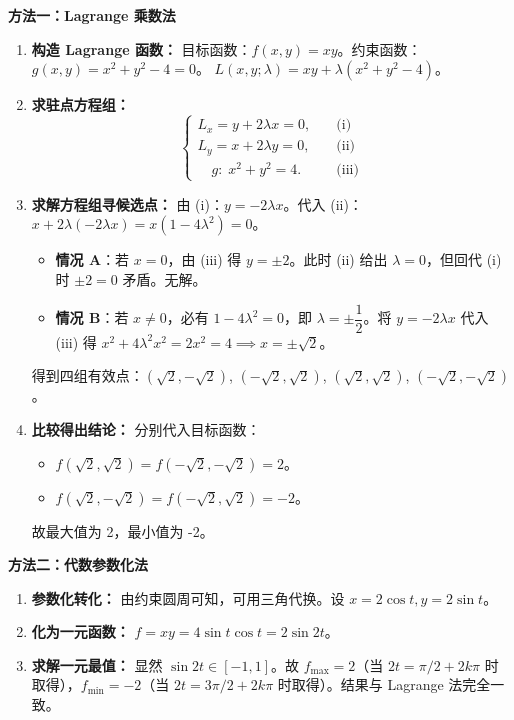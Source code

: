 \documentclass[lang=cn,11pt]{elegantbook}
\begin{document}
\begin{solution}
\textbf{方法一：Lagrange 乘数法}
\begin{enumerate}
  \item \textbf{构造 Lagrange 函数：} 
  目标函数：$f(x,y)=xy$。约束函数：$g(x,y)=x^2+y^2-4=0$。
  $L(x,y;\lambda)=xy+\lambda(x^2+y^2-4)$。
  
  \item \textbf{求驻点方程组：}
  \[
  \begin{cases}
  L_x = y + 2\lambda x = 0, &\quad\text{(i)}\\
  L_y = x + 2\lambda y = 0, &\quad\text{(ii)}\\
  \quad g: \;x^2+y^2 = 4. &\quad\text{(iii)}
  \end{cases}
  \]
  
  \item \textbf{求解方程组寻候选点：}
  由 (i)：$y=-2\lambda x$。代入 (ii)：$x+2\lambda(-2\lambda x)=x(1-4\lambda^2)=0$。
  \begin{itemize}
    \item \textbf{情况 A}：若 $x=0$，由 (iii) 得 $y=\pm 2$。此时 (ii) 给出 $\lambda=0$，但回代 (i) 时 $\pm 2 = 0$ 矛盾。无解。
    \item \textbf{情况 B}：若 $x \neq 0$，必有 $1-4\lambda^2=0$，即 $\lambda=\pm\dfrac{1}{2}$。将 $y=-2\lambda x$ 代入 (iii) 得 $x^2+4\lambda^2x^2=2x^2=4 \implies x=\pm\sqrt{2}$。
  \end{itemize}
  得到四组有效点：$(\sqrt{2},-\sqrt{2})$, $(-\sqrt{2},\sqrt{2})$, $(\sqrt{2},\sqrt{2})$, $(-\sqrt{2},-\sqrt{2})$。
  
  \item \textbf{比较得出结论：}
  分别代入目标函数：
  \begin{itemize}
    \item $f(\sqrt{2},\sqrt{2}) = f(-\sqrt{2},-\sqrt{2}) = 2$。
    \item $f(\sqrt{2},-\sqrt{2}) = f(-\sqrt{2},\sqrt{2}) = -2$。
  \end{itemize}
  故最大值为 2，最小值为 -2。
\end{enumerate}

\textbf{方法二：代数参数化法}
\begin{enumerate}
  \item \textbf{参数化转化：} 由约束圆周可知，可用三角代换。设 $x=2\cos t, y=2\sin t$。
  \item \textbf{化为一元函数：} $f = xy = 4\sin t\cos t = 2\sin 2t$。
  \item \textbf{求解一元最值：} 显然 $\sin 2t \in [-1, 1]$。故 $f_{\max}=2$（当 $2t=\pi/2+2k\pi$ 时取得），$f_{\min}=-2$（当 $2t=3\pi/2+2k\pi$ 时取得）。结果与 Lagrange 法完全一致。
\end{enumerate}
\end{solution}
\end{document}
